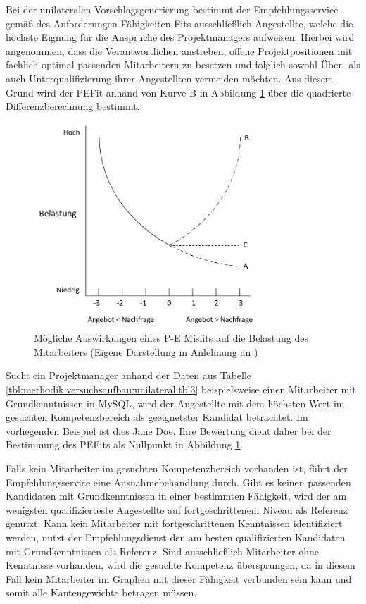 Bei der unilateralen Vorschlagsgenerierung bestimmt der Empfehlungsservice gemäß des Anforderungen-Fähigkeiten Fits ausschließlich Angestellte, welche die höchste Eignung für die Ansprüche des Projektmanagers aufweisen. Hierbei wird angenommen, dass die Verantwortlichen anstreben, offene Projektpositionen mit fachlich optimal passenden Mitarbeitern zu besetzen und folglich sowohl Über- als auch Unterqualifizierung ihrer Angestellten vermeiden möchten. Aus diesem Grund wird der \ac{PEFit} anhand von Kurve B in Abbildung \ref{fig:methodik:versuchsaufbau:unilateral:abb2} über die quadrierte Differenzberechnung bestimmt.

\begin{figure}[h]
	\centering
	\includegraphics[width=0.75\textwidth]{gfx/ueberschuss_supply_motive.png}
	\caption[Mögliche Auswirkungen eines P-E Misfits auf die Belastung des Mitarbeiters]{Mögliche Auswirkungen eines P-E Misfits auf die Belastung des Mitarbeiters (Eigene Darstellung in Anlehnung an \cite[S. 23]{edwards:2008})}
	\label{fig:methodik:versuchsaufbau:unilateral:abb2}
\end{figure}
\newpage
Sucht ein Projektmanager anhand der Daten aus Tabelle \ref{tbl:methodik:versuchsaufbau:unilateral:tbl3} beispielsweise einen Mitarbeiter mit Grundkenntnissen in MySQL, wird der Angestellte mit dem höchsten Wert im gesuchten Kompetenzbereich als geeignetster Kandidat betrachtet. Im vorliegenden Beispiel ist dies Jane Doe. Ihre Bewertung dient daher bei der Bestimmung des \acp{PEFit} als Nullpunkt in Abbildung \ref{fig:methodik:versuchsaufbau:unilateral:abb2}.

Falls kein Mitarbeiter im gesuchten Kompetenzbereich vorhanden ist, führt der Empfehlungsservice eine Ausnahmebehandlung durch. Gibt es keinen passenden Kandidaten mit Grundkenntnissen in einer bestimmten Fähigkeit, wird der am wenigsten qualifizierteste Angestellte auf fortgeschrittenem Niveau als Referenz genutzt. Kann kein Mitarbeiter mit fortgeschrittenen Kenntnissen identifiziert werden, nutzt der Empfehlungsdienst den am besten qualifizierten Kandidaten mit Grundkenntnissen als Referenz. Sind ausschließlich Mitarbeiter ohne Kenntnisse vorhanden, wird die gesuchte Kompetenz übersprungen, da in diesem Fall kein Mitarbeiter im Graphen mit dieser Fähigkeit verbunden sein kann und somit alle Kantengewichte \nullWert betragen müssen.

